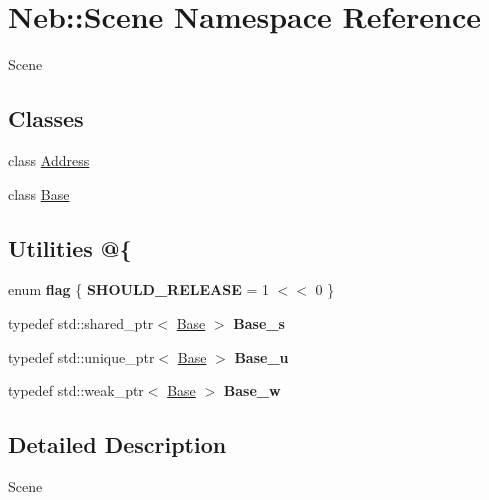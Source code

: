 \hypertarget{namespaceNeb_1_1Scene}{\section{\-Neb\-:\-:\-Scene \-Namespace \-Reference}
\label{namespaceNeb_1_1Scene}
}


\-Scene  


\subsection*{\-Classes}
\begin{DoxyCompactItemize}
\item 
class \hyperlink{classNeb_1_1Scene_1_1Address}{\-Address}
\item 
class \hyperlink{classNeb_1_1Scene_1_1Base}{\-Base}
\end{DoxyCompactItemize}
\subsection*{\-Utilities @\{}
\begin{DoxyCompactItemize}
\item 
enum {\bfseries flag} \{ {\bfseries \-S\-H\-O\-U\-L\-D\-\_\-\-R\-E\-L\-E\-A\-S\-E} =  1 $<$$<$ 0
 \}
\item 
\hypertarget{namespaceNeb_1_1Scene_aebcf94cf65fb1252f20b8eb7c0d145bf}{typedef std\-::shared\-\_\-ptr$<$ \hyperlink{classNeb_1_1Scene_1_1Base}{\-Base} $>$ {\bfseries \-Base\-\_\-s}}\label{namespaceNeb_1_1Scene_aebcf94cf65fb1252f20b8eb7c0d145bf}

\item 
\hypertarget{namespaceNeb_1_1Scene_a09fb947e0af96de8b83d0f872b128c40}{typedef std\-::unique\-\_\-ptr$<$ \hyperlink{classNeb_1_1Scene_1_1Base}{\-Base} $>$ {\bfseries \-Base\-\_\-u}}\label{namespaceNeb_1_1Scene_a09fb947e0af96de8b83d0f872b128c40}

\item 
\hypertarget{namespaceNeb_1_1Scene_a13c1594227693bd4c0ca2fcf841a5f8d}{typedef std\-::weak\-\_\-ptr$<$ \hyperlink{classNeb_1_1Scene_1_1Base}{\-Base} $>$ {\bfseries \-Base\-\_\-w}}\label{namespaceNeb_1_1Scene_a13c1594227693bd4c0ca2fcf841a5f8d}

\end{DoxyCompactItemize}


\subsection{\-Detailed \-Description}
\-Scene 